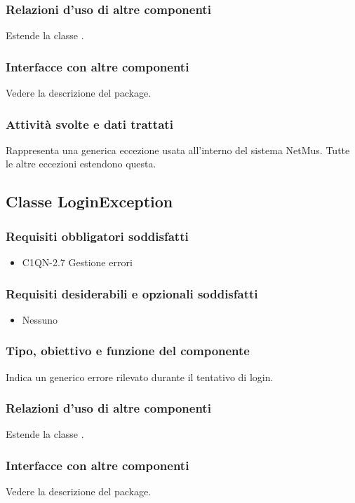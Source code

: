 \subsubsection*{Relazioni d'uso di altre componenti}
Estende la classe .
\subsubsection*{Interfacce con altre componenti}
Vedere la descrizione del package.
\subsubsection*{Attivit\`a svolte e dati trattati}
Rappresenta una generica eccezione usata all'interno del sistema NetMus. Tutte
le altre eccezioni estendono questa.

\subsection{Classe LoginException}
\subsubsection*{Requisiti obbligatori soddisfatti}
\begin{itemize}
	\item C1QN-2.7 Gestione errori
\end{itemize}
\subsubsection*{Requisiti desiderabili e opzionali soddisfatti}
\begin{itemize}
    \item Nessuno
\end{itemize}
\subsubsection*{Tipo, obiettivo e funzione del componente}
Indica un generico errore rilevato durante il tentativo di login.
\subsubsection*{Relazioni d'uso di altre componenti}
Estende la classe .
\subsubsection*{Interfacce con altre componenti}
Vedere la descrizione del package.
